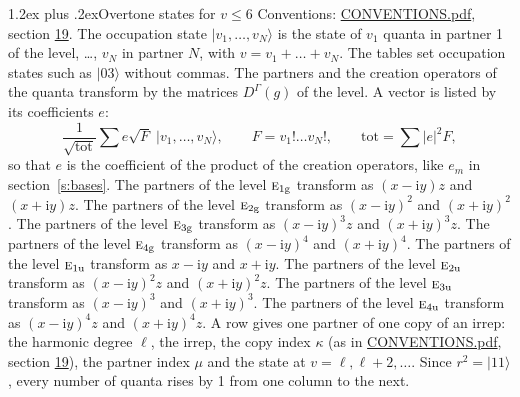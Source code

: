 \documentclass[10pt,a4paper]{article}
\makeatletter
\renewcommand\section{\@startsection{section}{1}{\z@}{-3ex plus -1ex minus -.2ex}%
  {1.2ex plus .2ex}{\normalfont\large\sffamily\bfseries\color{parttitle}}}
\numberwithin{equation}{section}
\newcommand{\irr}[1]{\text{\normalfont\scshape #1}}
\newcommand{\ptag}[1]{\mathrm{#1}}
\newcommand{\iunit}{\mathrm{i}}
\newcommand{\repD}[1]{D^{#1}}
\newcommand{\mult}{\kappa}
\newcommand{\intx}{\mu}
\newcommand{\occ}[1]{\lvert #1\rangle}
\makeatother
\begin{document}
\section{Overtone states for \texorpdfstring{$v \le 6$}{v \textleq\ 6}}\label{s:overtone_states}
Conventions: \href{../../CONVENTIONS.pdf}{CONVENTIONS.pdf}, section \href{../../CONVENTIONS.pdf\#conv.19}{19}.
\leavevmode\label{n:vector.occupation}\label{n:local.quanta.partner}\label{n:local.weight.occupation}The occupation state $\occ{v_1, \dots, v_N}$ is the state of $v_1$ quanta in partner 1 of the level, \dots, $v_N$ in partner $N$, with $v = v_1 + \dots + v_N$. The tables set occupation states such as $\occ{03}$ without commas. The partners and the creation operators of the quanta transform by the matrices $\repD{\Gamma}(g)$ of the level. A vector is listed by its coefficients $e$:
\begin{equation}\label{e:occupation}\frac{1}{\sqrt{\mathrm{tot}}}\sum e\sqrt{F}\;\occ{v_1, \dots, v_N},\qquad F = v_1!\dots v_N!,\qquad \mathrm{tot} = \sum |e|^2F,\end{equation}
so that $e$ is the coefficient of the product of the creation operators, like $e_m$ in section~\ref{s:bases}. The partners of the level $\irr{e}_{1\ptag{g}}$ transform as $(x - \iunit y) z$ and $(x + \iunit y) z$. The partners of the level $\irr{e}_{2\ptag{g}}$ transform as $(x - \iunit y)^{2}$ and $(x + \iunit y)^{2}$. The partners of the level $\irr{e}_{3\ptag{g}}$ transform as $(x - \iunit y)^{3} z$ and $(x + \iunit y)^{3} z$. The partners of the level $\irr{e}_{4\ptag{g}}$ transform as $(x - \iunit y)^{4}$ and $(x + \iunit y)^{4}$. The partners of the level $\irr{e}_{1\ptag{u}}$ transform as $x - \iunit y$ and $x + \iunit y$. The partners of the level $\irr{e}_{2\ptag{u}}$ transform as $(x - \iunit y)^{2} z$ and $(x + \iunit y)^{2} z$. The partners of the level $\irr{e}_{3\ptag{u}}$ transform as $(x - \iunit y)^{3}$ and $(x + \iunit y)^{3}$. The partners of the level $\irr{e}_{4\ptag{u}}$ transform as $(x - \iunit y)^{4} z$ and $(x + \iunit y)^{4} z$. A row gives one partner of one copy of an irrep: the harmonic degree $\ell$, the irrep, the copy index $\mult$ (as in \href{../../CONVENTIONS.pdf}{CONVENTIONS.pdf}, section \href{../../CONVENTIONS.pdf\#conv.19}{19}), the partner index $\intx$ and the state at $v = \ell, \ell + 2, \dots$. Since $r^2 = \occ{11}$, every number of quanta rises by 1 from one column to the next.
\end{document}
